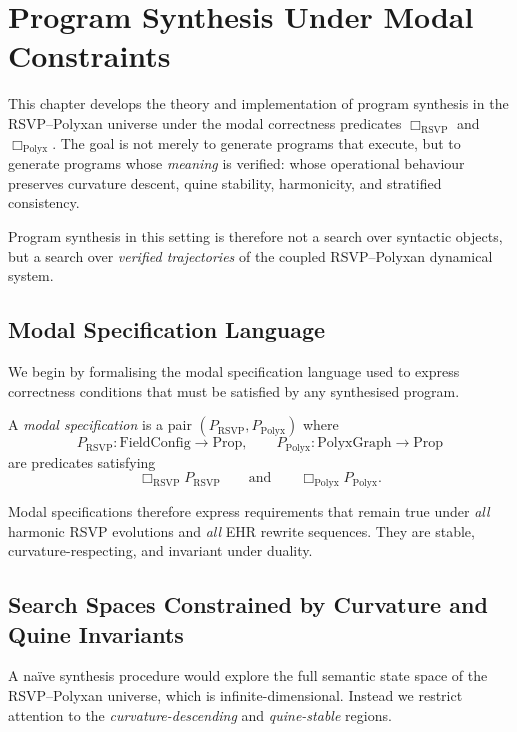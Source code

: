 \chapter{Program Synthesis Under Modal Constraints}
\label{ch:51}

This chapter develops the theory and implementation of program synthesis in the
RSVP--Polyxan universe under the modal correctness predicates
$\Box_{\mathrm{RSVP}}$ and $\Box_{\mathrm{Polyx}}$.
The goal is not merely to generate programs that execute, but to generate
programs whose \emph{meaning} is verified: whose operational behaviour preserves
curvature descent, quine stability, harmonicity, and stratified consistency.

Program synthesis in this setting is therefore not a search over syntactic
objects, but a search over \emph{verified trajectories} of the coupled
RSVP--Polyxan dynamical system.


\section{Modal Specification Language}
\label{sec:51:modal-spec}

We begin by formalising the modal specification language used to express
correctness conditions that must be satisfied by any synthesised program.

\begin{definition}
A \emph{modal specification} is a pair $(P_{\mathrm{RSVP}},
P_{\mathrm{Polyx}})$ where
\[
P_{\mathrm{RSVP}}:\mathrm{FieldConfig}\to\mathrm{Prop},\qquad
P_{\mathrm{Polyx}}:\mathrm{PolyxGraph}\to\mathrm{Prop}
\]
are predicates satisfying
\[
\Box_{\mathrm{RSVP}} P_{\mathrm{RSVP}}
\qquad\text{and}\qquad
\Box_{\mathrm{Polyx}} P_{\mathrm{Polyx}}.
\]
\end{definition}

Modal specifications therefore express requirements that remain true under
\emph{all} harmonic RSVP evolutions and \emph{all} EHR rewrite sequences.
They are stable, curvature-respecting, and invariant under duality.


\section{Search Spaces Constrained by Curvature and Quine Invariants}
\label{sec:51:search-space}

A naïve synthesis procedure would explore the full semantic state space of the
RSVP--Polyxan universe, which is infinite-dimensional.  
Instead we restrict attention to the \emph{curvature-descending} and
\emph{quine-stable} regions.


